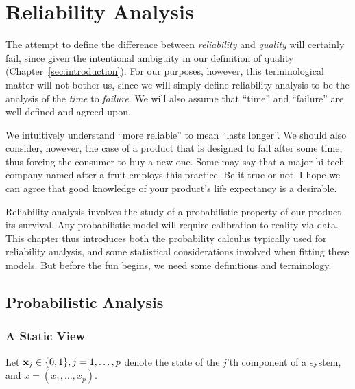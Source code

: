 \chapter{Reliability Analysis}

The attempt to define the difference between \emph{reliability} and \emph{quality} will certainly fail, since given the intentional ambiguity in our definition of quality (Chapter~\ref{sec:introduction}).
For our purposes, however, this terminological matter will not bother us, since we will simply define reliability analysis to be the analysis of the \emph{time} to \emph{failure}.
We will also assume that ``time'' and ``failure'' are well defined and agreed upon.

We intuitively understand ``more reliable'' to mean ``lasts longer''. 
We should also consider, however, the case of a product that is designed to fail after some time, thus forcing the consumer to buy a new one. 
Some may say that a major hi-tech company named after a fruit employs this practice. 
Be it true or not, I hope we can agree that good knowledge of your product's life expectancy is a desirable. 

Reliability analysis involves the study of a probabilistic property of our product- its survival.
Any probabilistic model will require calibration to reality via data. 
This chapter thus introduces both the probability calculus typically used for reliability analysis, and some statistical considerations involved when fitting these models.
But before the fun begins, we need some definitions and terminology.






\section{Probabilistic Analysis}




\subsection{A Static View}

Let $\mathbf{x}_j \in \{ 0,1 \}, j=1,\dots,p$ denote the state of the $j$'th component of a system, and $x=(x_1,\dots,x_p)$.

